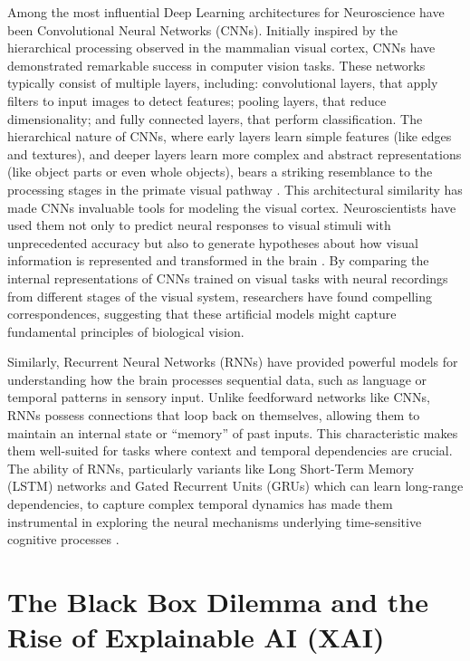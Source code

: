 \documentclass[11pt,a4paper]{article}
\begin{document}
Among the most influential Deep Learning architectures for Neuroscience have been Convolutional Neural Networks (CNNs). Initially inspired by the hierarchical processing observed in the mammalian visual cortex, CNNs have demonstrated remarkable success in computer vision tasks. These networks typically consist of multiple layers, including: convolutional layers, that apply filters to input images to detect features; pooling layers, that reduce dimensionality; and fully connected layers, that perform classification. The hierarchical nature of CNNs, where early layers learn simple features (like edges and textures), and deeper layers learn more complex and abstract representations (like object parts or even whole objects), bears a striking resemblance to the processing stages in the primate visual pathway \cite{yamins2016using}. This architectural similarity has made CNNs invaluable tools for modeling the visual cortex. Neuroscientists have used them not only to predict neural responses to visual stimuli with unprecedented accuracy but also to generate hypotheses about how visual information is represented and transformed in the brain \cite{kriegeskorte2018cognitive, savage2019how}. By comparing the internal representations of CNNs trained on visual tasks with neural recordings from different stages of the visual system, researchers have found compelling correspondences, suggesting that these artificial models might capture fundamental principles of biological vision.

Similarly, Recurrent Neural Networks (RNNs) have provided powerful models for understanding how the brain processes sequential data, such as language or temporal patterns in sensory input. Unlike feedforward networks like CNNs, RNNs possess connections that loop back on themselves, allowing them to maintain an internal state or ``memory'' of past inputs. This characteristic makes them well-suited for tasks where context and temporal dependencies are crucial. The ability of RNNs, particularly variants like Long Short-Term Memory (LSTM) networks and Gated Recurrent Units (GRUs) which can learn long-range dependencies, to capture complex temporal dynamics has made them instrumental in exploring the neural mechanisms underlying time-sensitive cognitive processes \cite{richards2019deep}.

\clearpage

\part{The Black Box Dilemma and the Rise of Explainable AI (XAI)}
\end{document}
